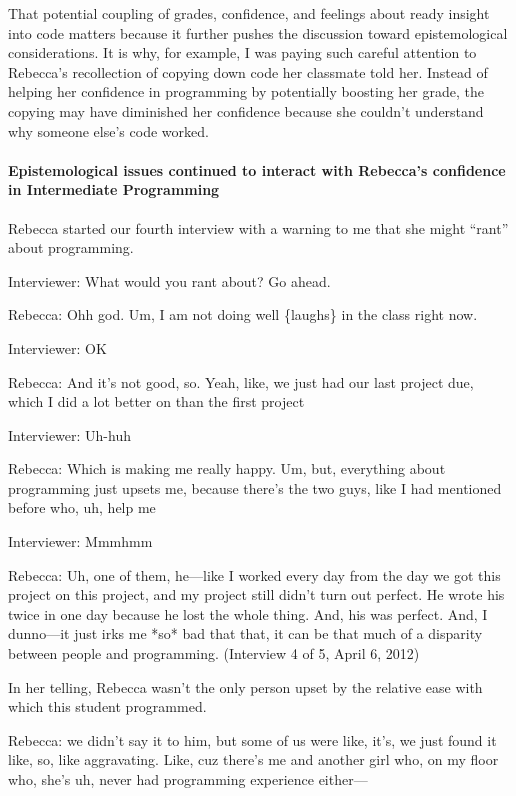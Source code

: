 That potential coupling of grades, confidence, and feelings about ready
insight into code matters because it further pushes the discussion
toward epistemological considerations. It is why, for example, I was
paying such careful attention to Rebecca's recollection of copying down
code her classmate told her. Instead of helping her confidence in
programming by potentially boosting her grade, the copying may have
diminished her confidence because she couldn't understand why someone
else's code worked.

\paragraph{Epistemological issues continued to interact with Rebecca's
confidence in Intermediate
Programming}\label{epistemological-issues-continued-to-interact-with-rebeccas-confidence-in-intermediate-programming}

Rebecca started our fourth interview with a warning to me that she might
``rant'' about programming.

Interviewer: What would you rant about? Go ahead.

Rebecca: Ohh god. Um, I am not doing well \{laughs\} in the class right
now.

Interviewer: OK

Rebecca: And it's not good, so. Yeah, like, we just had our last project
due, which I did a lot better on than the first project

Interviewer: Uh-huh

Rebecca: Which is making me really happy. Um, but, everything about
programming just upsets me, because there's the two guys, like I had
mentioned before who, uh, help me

Interviewer: Mmmhmm

Rebecca: Uh, one of them, he---like I worked every day from the day we
got this project on this project, and my project still didn't turn out
perfect. He wrote his twice in one day because he lost the whole thing.
And, his was perfect. And, I dunno---it just irks me *so* bad that that,
it can be that much of a disparity between people and programming.
(Interview 4 of 5, April 6, 2012)

In her telling, Rebecca wasn't the only person upset by the relative
ease with which this student programmed.

Rebecca: we didn't say it to him, but some of us were like, it's, we
just found it like, so, like aggravating. Like, cuz there's me and
another girl who, on my floor who, she's uh, never had programming
experience either---

